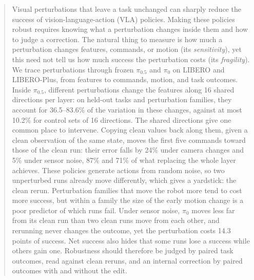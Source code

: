 \begin{abstract}
Visual perturbations that leave a task unchanged can sharply reduce the success of vision-language-action (VLA) policies. Making these policies robust requires knowing what a perturbation changes inside them and how to judge a correction. The natural thing to measure is how much a perturbation changes features, commands, or motion (its \emph{sensitivity}), yet this need not tell us how much success the perturbation costs (its \emph{fragility}). We trace perturbations through frozen $\pi_{0.5}$ and $\pi_0$ on LIBERO and LIBERO-Plus, from features to commands, motion, and task outcomes. Inside $\pi_{0.5}$, different perturbations change the features along 16 shared directions per layer: on held-out tasks and perturbation families, they account for 36.5--83.6\% of the variation in these changes, against at most 10.2\% for control sets of 16 directions. The shared directions give one common place to intervene. Copying clean values back along them, given a clean observation of the same state, moves the first five commands toward those of the clean run: their error falls by 24\% under camera changes and 5\% under sensor noise, 87\% and 71\% of what replacing the whole layer achieves. These policies generate actions from random noise, so two unperturbed runs already move differently, which gives a yardstick: the clean rerun. Perturbation families that move the robot more tend to cost more success, but within a family the size of the early motion change is a poor predictor of which runs fail. Under sensor noise, $\pi_0$ moves less far from its clean run than two clean runs move from each other, and rerunning never changes the outcome, yet the perturbation costs 14.3 points of success. Net success also hides that some runs lose a success while others gain one. Robustness should therefore be judged by paired task outcomes, read against clean reruns, and an internal correction by paired outcomes with and without the edit.
\end{abstract}
